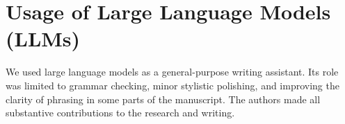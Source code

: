 \documentclass{article} %
\newtheorem{remark}[theorem]{Remark}
\begin{document}



\section{Usage of Large Language Models (LLMs)}
We used large language models as a general-purpose writing assistant. Its role was limited to grammar checking, minor stylistic polishing, and improving the clarity of phrasing in some parts of the manuscript. The authors made all substantive contributions to the research and writing.
\end{document}
